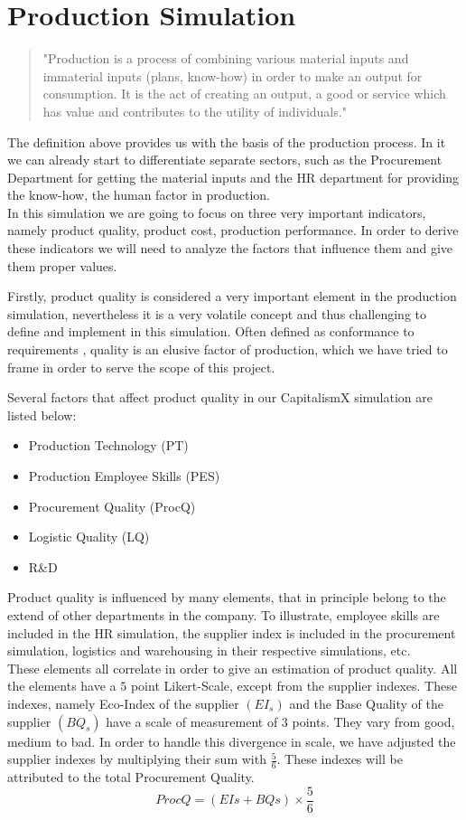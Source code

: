 \section{Production Simulation}
\label{sec:productionSim}
 \begin{quotation}
"Production is a process of combining various material inputs and immaterial inputs (plans, know-how) in order to make an output for consumption. It is the act of creating an output, a good or service which has value and contributes to the utility of individuals."\cite{noauthor_production_2019}
 \end{quotation}
The definition above provides us with the basis of the production process. In it we can already start to differentiate separate sectors, such as the Procurement Department for getting the material inputs and the HR department for providing the know-how, the human factor in production. \\
In this simulation we are going to focus on three very important indicators, namely product quality, product cost, production performance. In order to derive these indicators we will need to analyze the factors that influence them and give them proper values. 

Firstly, product quality is considered a very important element in the production simulation, nevertheless it is a very volatile concept and thus challenging to define and implement in this simulation. Often defined as conformance to requirements \cite{crosby_quality_1979}, quality is an elusive factor of production, which we have tried to frame in order to serve the scope of this project.

 Several factors that affect product quality in our CapitalismX simulation are listed below:
\begin{itemize}
\item Production Technology (PT)
\item Production Employee Skills (PES)
\item Procurement Quality (ProcQ)
\item Logistic Quality (LQ)
\item R\&D
\end{itemize}
Product quality is influenced by many elements, that in principle belong to the extend of other departments in the company. To illustrate, employee skills are included in the HR simulation, the supplier index is included in the procurement simulation, logistics and warehousing in their respective simulations, etc. \\
These elements all correlate in order to give an estimation of product quality.
All the elements have a $5$ point Likert-Scale, except from the supplier indexes.
These indexes, namely Eco-Index of the supplier $(EI_{s})$ and the Base Quality of the supplier $(BQ_{s})$ have a scale of measurement of $3$ points. They vary from good, medium to bad. In order to handle this divergence in scale, we have adjusted the supplier indexes by multiplying their sum with $\frac{5}{6}$. These indexes will be attributed to the total Procurement Quality.
\begin{equation}
ProcQ=(EIs + BQs)\times \frac{5}{6}
\end{equation}

